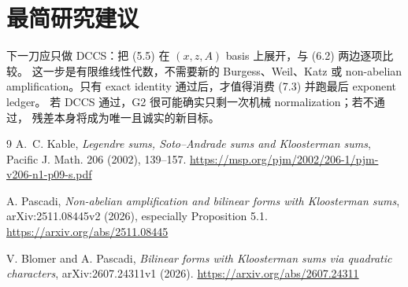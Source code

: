 \documentclass[11pt,a4paper]{ctexart}
\theoremstyle{definition}
\newcommand{\1}{\mathbf 1}
\begin{document}
\section{最简研究建议}

下一刀应只做 DCCS：把 (5.5) 在 $(x,z,A)$ basis 上展开，与 (6.2) 两边逐项比较。
这一步是有限维线性代数，不需要新的 Burgess、Weil、Katz 或 non-abelian
amplification。只有 exact identity 通过后，才值得消费 (7.3) 并跑最后 exponent ledger。
若 DCCS 通过，G2 很可能确实只剩一次机械 normalization；若不通过，
残差本身将成为唯一且诚实的新目标。

\begin{thebibliography}{9}
A.~C. Kable,
\emph{Legendre sums, Soto--Andrade sums and Kloosterman sums},
Pacific J. Math. 206 (2002), 139--157.
\url{https://msp.org/pjm/2002/206-1/pjm-v206-n1-p09-s.pdf}

A. Pascadi,
\emph{Non-abelian amplification and bilinear forms with Kloosterman sums},
arXiv:2511.08445v2 (2026), especially Proposition 5.1.
\url{https://arxiv.org/abs/2511.08445}

V. Blomer and A. Pascadi,
\emph{Bilinear forms with Kloosterman sums via quadratic characters},
arXiv:2607.24311v1 (2026).
\url{https://arxiv.org/abs/2607.24311}
\end{thebibliography}
\end{document}
